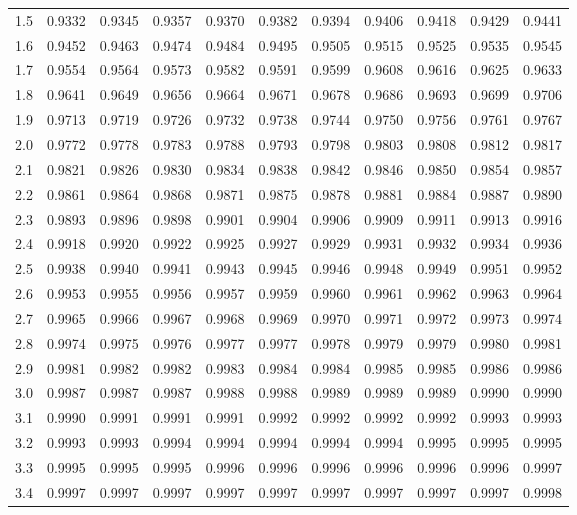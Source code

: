 \begin{frame}
{\begin{tabular}{l|lllllll>{\columncolor{light-blue}}lll}
1.5 & 0.9332 & 0.9345 & 0.9357 & 0.9370 & 0.9382 & 0.9394 & 0.9406 & 0.9418 & 0.9429 & 0.9441 \\ 
1.6 & 0.9452 & 0.9463 & 0.9474 & 0.9484 & 0.9495 & 0.9505 & 0.9515 & 0.9525 & 0.9535 & 0.9545 \\ 
1.7 & 0.9554 & 0.9564 & 0.9573 & 0.9582 & 0.9591 & 0.9599 & 0.9608 & 0.9616 & 0.9625 & 0.9633 \\ 
1.8 & 0.9641 & 0.9649 & 0.9656 & 0.9664 & 0.9671 & 0.9678 & 0.9686 & 0.9693 & 0.9699 & 0.9706 \\ 
1.9 & 0.9713 & 0.9719 & 0.9726 & 0.9732 & 0.9738 & 0.9744 & 0.9750 & 0.9756 & 0.9761 & 0.9767 \\ 
2.0 & 0.9772 & 0.9778 & 0.9783 & 0.9788 & 0.9793 & 0.9798 & 0.9803 & 0.9808 & 0.9812 & 0.9817 \\ 
2.1 & 0.9821 & 0.9826 & 0.9830 & 0.9834 & 0.9838 & 0.9842 & 0.9846 & 0.9850 & 0.9854 & 0.9857 \\ 
2.2 & 0.9861 & 0.9864 & 0.9868 & 0.9871 & 0.9875 & 0.9878 & 0.9881 & 0.9884 & 0.9887 & 0.9890 \\ 
2.3 & 0.9893 & 0.9896 & 0.9898 & 0.9901 & 0.9904 & 0.9906 & 0.9909 & 0.9911 & 0.9913 & 0.9916 \\ 
2.4 & 0.9918 & 0.9920 & 0.9922 & 0.9925 & 0.9927 & 0.9929 & 0.9931 & 0.9932 & 0.9934 & 0.9936 \\ 
2.5 & 0.9938 & 0.9940 & 0.9941 & 0.9943 & 0.9945 & 0.9946 & 0.9948 & 0.9949 & 0.9951 & 0.9952 \\ 
2.6 & 0.9953 & 0.9955 & 0.9956 & 0.9957 & 0.9959 & 0.9960 & 0.9961 & 0.9962 & 0.9963 & 0.9964 \\ 
2.7 & 0.9965 & 0.9966 & 0.9967 & 0.9968 & 0.9969 & 0.9970 & 0.9971 & 0.9972 & 0.9973 & 0.9974 \\ 
2.8 & 0.9974 & 0.9975 & 0.9976 & 0.9977 & 0.9977 & 0.9978 & 0.9979 & 0.9979 & 0.9980 & 0.9981 \\ 
2.9 & 0.9981 & 0.9982 & 0.9982 & 0.9983 & 0.9984 & 0.9984 & 0.9985 & 0.9985 & 0.9986 & 0.9986 \\ 
3.0 & 0.9987 & 0.9987 & 0.9987 & 0.9988 & 0.9988 & 0.9989 & 0.9989 & 0.9989 & 0.9990 & 0.9990 \\ 
3.1 & 0.9990 & 0.9991 & 0.9991 & 0.9991 & 0.9992 & 0.9992 & 0.9992 & 0.9992 & 0.9993 & 0.9993 \\ 
3.2 & 0.9993 & 0.9993 & 0.9994 & 0.9994 & 0.9994 & 0.9994 & 0.9994 & 0.9995 & 0.9995 & 0.9995 \\ 
3.3 & 0.9995 & 0.9995 & 0.9995 & 0.9996 & 0.9996 & 0.9996 & 0.9996 & 0.9996 & 0.9996 & 0.9997 \\ 
3.4 & 0.9997 & 0.9997 & 0.9997 & 0.9997 & 0.9997 & 0.9997 & 0.9997 & 0.9997 & 0.9997 & 0.9998 
\end{tabular}



}

\end{frame}


